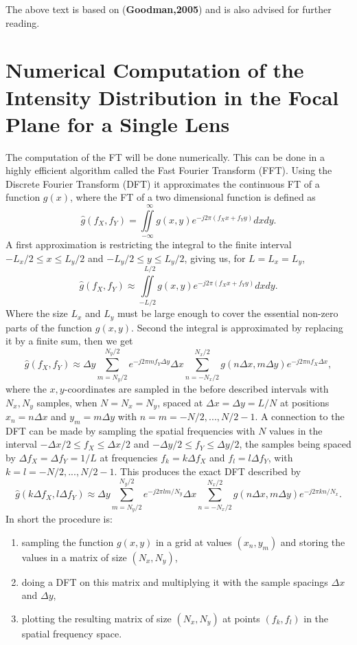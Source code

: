 \documentclass{article}
\begin{document}
The above text is based on (\textbf{Goodman,2005}) and is also advised for further reading.

\section{Numerical Computation of the Intensity Distribution in the Focal Plane for a Single Lens}
The computation of the FT will be done numerically. This can be done in a highly efficient algorithm called the Fast Fourier Transform (FFT). Using the Discrete Fourier Transform (DFT) it approximates the continuous FT of a function $g(x)$, where the FT of a two dimensional function is defined as
\begin{equation}
\hat{g}(f_X,f_Y)=\iint\limits_{-\infty}^{~~~\infty} g(x,y)e^{-j2\pi(f_Xx + f_Yy)}dxdy.
\end{equation}
A first approximation is restricting the integral to the finite interval $-L_x/2 \leq x \leq L_y/2$ and $-L_y/2 \leq y \leq L_y/2$, giving us, for $L=L_x=L_y$,
\begin{equation}
\hat{g}(f_X,f_Y)\approx\iint\limits_{-L/2}^{~~~L/2} g(x,y)e^{-j2\pi(f_Xx + f_Yy)}dxdy.
\end{equation}
Where the size $L_x$ and $L_y$ must be large enough to cover the essential non-zero parts of the function $g(x,y)$. Second the integral is approximated by replacing it by a finite sum, then we get
\begin{equation}
\hat{g}(f_X,f_Y)\approx  \Delta y \sum\limits_{m=N_y/2}^{N_y/2} e^{-j2\pi mf_Y\Delta y}\Delta x\sum\limits_{n=-N_x/2}^{N_x/2}g(n\Delta x,m\Delta y)e^{-j2\pi nf_X\Delta x },
\end{equation}
where the $x,y$-coordinates are sampled in the before described intervals with $N_x,N_y$ samples, when $N=N_x=N_y$, spaced at $\Delta x=\Delta y = L/N$ at positions $x_n=n\Delta x$ and $y_m=m\Delta y$ with $n=m=-N/2,...,N/2-1$. A connection to the DFT can be made by sampling the spatial frequencies with $N$ values in the interval $-\Delta x/2 \leq f_X \leq \Delta x/2$ and $-\Delta y/2 \leq f_Y \leq \Delta y/2$, the samples being spaced by $\Delta f_X=\Delta f_Y=1/L$ at frequencies $f_k=k\Delta f_X$ and $f_l=l\Delta f_Y$, with $k=l=-N/2,...,N/2-1$. This produces the exact DFT described by
\begin{equation}
\hat{g}(k\Delta f_X,l\Delta f_Y)\approx  \Delta y \sum\limits_{m=N_y/2}^{N_y/2} e^{-j2\pi lm/N_y}\Delta x\sum\limits_{n=-N_x/2}^{N_x/2}g(n\Delta x,m\Delta y)e^{-j2\pi kn/N_x}.
\end{equation}
In short the procedure is:
\begin{enumerate}
	\item sampling the function $g(x,y)$ in a grid at values $(x_n,y_m)$ and storing the values in a matrix of size $(N_x,N_y)$,
	\item doing a DFT on this matrix and multiplying it with the sample spacings $\Delta x$ and $\Delta y$,
	\item plotting the resulting matrix of size $(N_x,N_y)$ at points $(f_k,f_l)$ in the spatial frequency space.
\end{enumerate}
\end{document}
